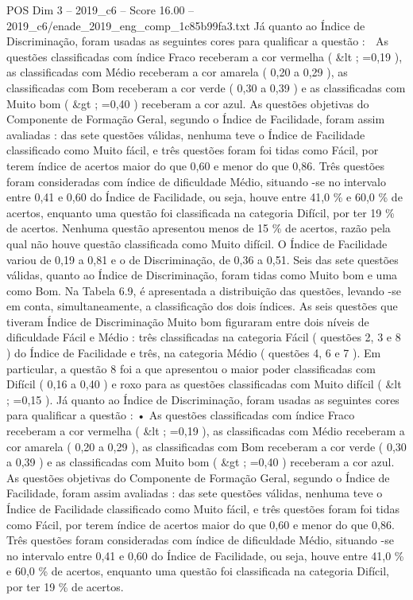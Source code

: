 \begin{textsample}{POS Dim 3 – 2019\_c6 – Score 16.00 – 2019\_c6/enade\_2019\_eng\_comp\_1c85b99fa3.txt}
Já quanto ao Índice de Discriminação, foram usadas as seguintes cores para qualificar a questão :  As questões classificadas com índice Fraco receberam a cor vermelha ( \&lt ; =0,19 ), as classificadas com Médio receberam a cor amarela ( 0,20 a 0,29 ), as classificadas com Bom receberam a cor verde ( 0,30 a 0,39 ) e as classificadas com Muito bom ( \&gt ; =0,40 ) receberam a cor azul.
As questões objetivas do Componente de Formação Geral, segundo o Índice de Facilidade, foram assim avaliadas : das sete questões válidas, nenhuma teve o Índice de Facilidade classificado como Muito fácil, e três questões foram foi tidas como Fácil, por terem índice de acertos maior do que 0,60 e menor do que 0,86.
Três questões foram consideradas com índice de dificuldade Médio, situando -se no intervalo entre 0,41 e 0,60 do Índice de Facilidade, ou seja, houve entre 41,0 \% e 60,0 \% de acertos, enquanto uma questão foi classificada na categoria Difícil, por ter 19 \% de acertos.
Nenhuma questão apresentou menos de 15 \% de acertos, razão pela qual não houve questão classificada como Muito difícil.
O Índice de Facilidade variou de 0,19 a 0,81 e o de Discriminação, de 0,36 a 0,51.
Seis das sete questões válidas, quanto ao Índice de Discriminação, foram tidas como Muito bom e uma como Bom.
Na Tabela 6.9, é apresentada a distribuição das questões, levando -se em conta, simultaneamente, a classificação dos dois índices.
As seis questões que tiveram Índice de Discriminação Muito bom figuraram entre dois níveis de dificuldade Fácil e Médio : três classificadas na categoria Fácil ( questões 2, 3 e 8 ) do Índice de Facilidade e três, na categoria Médio ( questões 4, 6 e 7 ).
Em particular, a questão 8 foi a que apresentou o maior poder classificadas com Difícil ( 0,16 a 0,40 ) e roxo para as questões classificadas com Muito difícil ( \&lt ; =0,15 ).
Já quanto ao Índice de Discriminação, foram usadas as seguintes cores para qualificar a questão : • As questões classificadas com índice Fraco receberam a cor vermelha ( \&lt ; =0,19 ), as classificadas com Médio receberam a cor amarela ( 0,20 a 0,29 ), as classificadas com Bom receberam a cor verde ( 0,30 a 0,39 ) e as classificadas com Muito bom ( \&gt ; =0,40 ) receberam a cor azul.
As questões objetivas do Componente de Formação Geral, segundo o Índice de Facilidade, foram assim avaliadas : das sete questões válidas, nenhuma teve o Índice de Facilidade classificado como Muito fácil, e três questões foram foi tidas como Fácil, por terem índice de acertos maior do que 0,60 e menor do que 0,86.
Três questões foram consideradas com índice de dificuldade Médio, situando -se no intervalo entre 0,41 e 0,60 do Índice de Facilidade, ou seja, houve entre 41,0 \% e 60,0 \% de acertos, enquanto uma questão foi classificada na categoria Difícil, por ter 19 \% de acertos.

\end{textsample}
